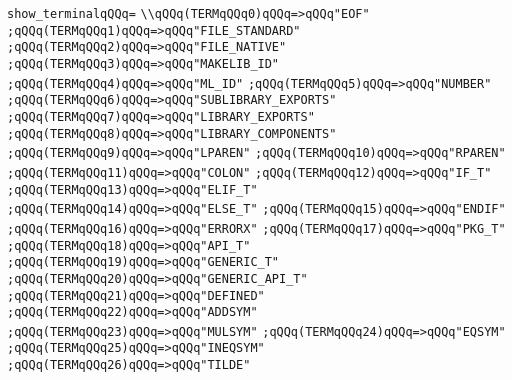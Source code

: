 \verb|show_terminalqQQq=|\newline
\verb|\\qQQq(TERMqQQq0)qQQq=>qQQq"EOF"|\newline
\verb|;qQQq(TERMqQQq1)qQQq=>qQQq"FILE_STANDARD"|\newline
\verb|;qQQq(TERMqQQq2)qQQq=>qQQq"FILE_NATIVE"|\newline
\verb|;qQQq(TERMqQQq3)qQQq=>qQQq"MAKELIB_ID"|\newline
\verb|;qQQq(TERMqQQq4)qQQq=>qQQq"ML_ID"|\newline
\verb|;qQQq(TERMqQQq5)qQQq=>qQQq"NUMBER"|\newline
\verb|;qQQq(TERMqQQq6)qQQq=>qQQq"SUBLIBRARY_EXPORTS"|\newline
\verb|;qQQq(TERMqQQq7)qQQq=>qQQq"LIBRARY_EXPORTS"|\newline
\verb|;qQQq(TERMqQQq8)qQQq=>qQQq"LIBRARY_COMPONENTS"|\newline
\verb|;qQQq(TERMqQQq9)qQQq=>qQQq"LPAREN"|\newline
\verb|;qQQq(TERMqQQq10)qQQq=>qQQq"RPAREN"|\newline
\verb|;qQQq(TERMqQQq11)qQQq=>qQQq"COLON"|\newline
\verb|;qQQq(TERMqQQq12)qQQq=>qQQq"IF_T"|\newline
\verb|;qQQq(TERMqQQq13)qQQq=>qQQq"ELIF_T"|\newline
\verb|;qQQq(TERMqQQq14)qQQq=>qQQq"ELSE_T"|\newline
\verb|;qQQq(TERMqQQq15)qQQq=>qQQq"ENDIF"|\newline
\verb|;qQQq(TERMqQQq16)qQQq=>qQQq"ERRORX"|\newline
\verb|;qQQq(TERMqQQq17)qQQq=>qQQq"PKG_T"|\newline
\verb|;qQQq(TERMqQQq18)qQQq=>qQQq"API_T"|\newline
\verb|;qQQq(TERMqQQq19)qQQq=>qQQq"GENERIC_T"|\newline
\verb|;qQQq(TERMqQQq20)qQQq=>qQQq"GENERIC_API_T"|\newline
\verb|;qQQq(TERMqQQq21)qQQq=>qQQq"DEFINED"|\newline
\verb|;qQQq(TERMqQQq22)qQQq=>qQQq"ADDSYM"|\newline
\verb|;qQQq(TERMqQQq23)qQQq=>qQQq"MULSYM"|\newline
\verb|;qQQq(TERMqQQq24)qQQq=>qQQq"EQSYM"|\newline
\verb|;qQQq(TERMqQQq25)qQQq=>qQQq"INEQSYM"|\newline
\verb|;qQQq(TERMqQQq26)qQQq=>qQQq"TILDE"|\newline
